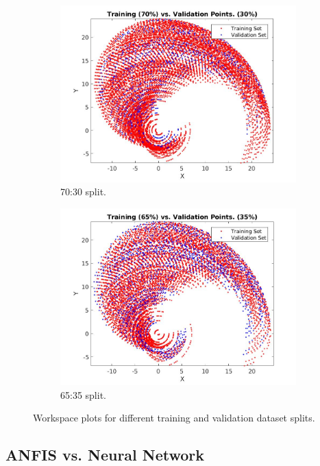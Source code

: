 \documentclass[a4paper, oneside, 12pt]{article}
\begin{document}
\begin{figure}[H]
\begin{subfigure}{0.48\textwidth}
		\includegraphics[width=1\textwidth]{trnvsval70.jpg}
		\caption{70:30 split.}
		\label{fig::1c}
	\end{subfigure}	
	\begin{subfigure}{0.48\textwidth}
		\includegraphics[width=1\textwidth]{trnvsval65.jpg}
		\caption{65:35 split.}
		\label{fig::1d}
	\end{subfigure}	
	\caption{Workspace plots for different training and validation dataset splits.}
	\label{fig::1}
\end{figure}

\newpage
\subsection{ANFIS vs. Neural Network}
\end{document}
